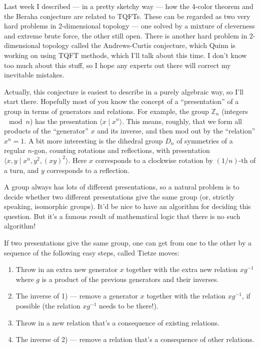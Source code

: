 \documentclass{article}
\def\tightlist{}
\begin{document}
Last week I described --- in a pretty sketchy way --- how the 4-color
theorem and the Beraha conjecture are related to TQFTs. These can be
regarded as two very hard problems in 2-dimensional topology --- one
solved by a mixture of cleverness and extreme brute force, the other
still open. There is another hard problem in 2-dimensional topology
called the Andrews-Curtis conjecture, which Quinn is working on using
TQFT methods, which I'll talk about this time. I don't know too much
about this stuff, so I hope any experts out there will correct my
inevitable mistakes.

Actually, this conjecture is easiest to describe in a purely algebraic
way, so I'll start there. Hopefully most of you know the concept of a
``presentation'' of a group in terms of generators and relations. For
example, the group \(\mathbb{Z}_n\) (integers \(\mod n\)) has the
presentation \(\langle x \mid x^n\rangle\). This means, roughly, that we
form all products of the ``generator'' \(x\) and its inverse, and then
mod out by the ``relation'' \(x^n = 1\). A bit more interesting is the
dihedral group \(D_n\) of symmetries of a regular \(n\)-gon, counting
rotations and reflections, with presentation
\(\langle x,y \mid x^n, y^2, (xy)^2 \rangle\). Here \(x\) corresponds to
a clockwise rotation by \((1/n)\)-th of a turn, and \(y\) corresponds to
a reflection.

A group always has lots of different presentations, so a natural problem
is to decide whether two different presentations give the same group
(or, strictly speaking, isomorphic groups). It'd be nice to have an
algorithm for deciding this question. But it's a famous result of
mathematical logic that there is no such algorithm!

If two presentations give the same group, one can get from one to the
other by a sequence of the following easy steps, called Tietze moves:

\begin{enumerate}
\def\labelenumi{\arabic{enumi})}
\tightlist
\item
  Throw in an extra new generator \(x\) together with the extra new
  relation \(xg^{-1}\) where \(g\) is a product of the previous
  generators and their inverses.
\item
  The inverse of 1) --- remove a generator \(x\) together with the
  relation \(xg^{-1}\), if possible (the relation \(xg^{-1}\) needs to
  be there!).
\item
  Throw in a new relation that's a consequence of existing relations.
\item
  The inverse of 2) --- remove a relation that's a consequence of other
  relations.
\end{enumerate}
\end{document}
